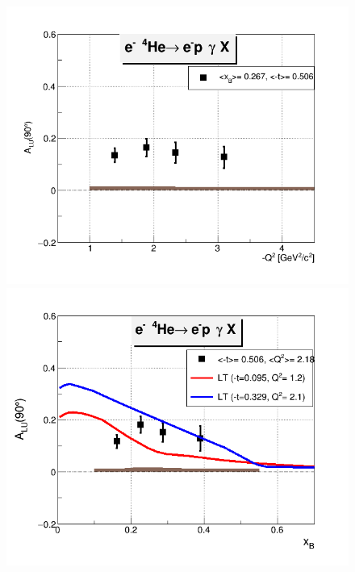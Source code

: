 \begin{figure}[tpb]
\centering
\vspace{-0.2in}
\includegraphics[scale=0.37]{fig_ch5/incoh_alu_Q2_90.png} \\
\vspace{-0.1in}
\includegraphics[scale=0.37]{fig_ch5/incoh_alu_xB_90.png}\\ 
\vspace{-0.1in}

\end{figure}
